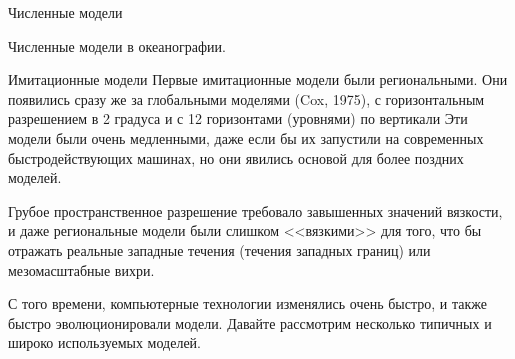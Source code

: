 \begin{chapter}{Численные модели}
\begin{section}{Численные модели в океанографии.}
\begin{paragraph}{Имитационные модели}
Первые имитационные модели были региональными. Они появились сразу же
за глобальными моделями (Cox, 1975), с горизонтальным разрешением в 2
градуса и с 12 горизонтами (уровнями) по вертикали Эти модели были
очень медленными, даже если бы их запустили на современных
быстродействующих машинах, но они явились основой для более поздних
моделей.

Грубое пространственное разрешение требовало завышенных значений
вязкости, и даже региональные модели были слишком <<вязкими>> для того,
что бы отражать реальные западные течения (течения западных границ)
или мезомасштабные вихри.
%

С того времени, компьютерные технологии изменялись очень быстро, и
также быстро эволюционировали модели. Давайте рассмотрим несколько
типичных и широко используемых моделей.
%
\end{paragraph}


\end{section}
\end{chapter}
